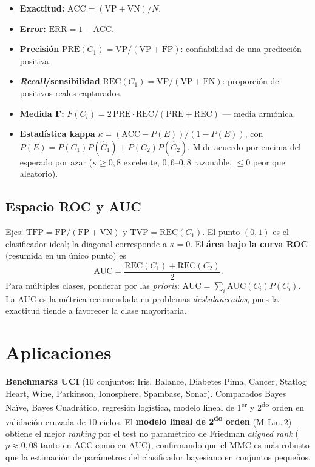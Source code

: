 \begin{itemize}[leftmargin=1.2cm]
  \item \textbf{Exactitud:} $\mathrm{ACC}=(\mathrm{VP}+\mathrm{VN})/N$.
  \item \textbf{Error:} $\mathrm{ERR}=1-\mathrm{ACC}$.
  \item \textbf{Precisión}
        $\mathrm{PRE}(C_1)=\mathrm{VP}/(\mathrm{VP}+\mathrm{FP})$:
        confiabilidad de una predicción positiva.
  \item \textbf{\emph{Recall}/sensibilidad}
        $\mathrm{REC}(C_1)=\mathrm{VP}/(\mathrm{VP}+\mathrm{FN})$:
        proporción de positivos reales capturados.
  \item \textbf{Medida F:}
        $F(C_i)=2\,\mathrm{PRE}\cdot\mathrm{REC}/(\mathrm{PRE}+\mathrm{REC})$
        --- media armónica.
  \item \textbf{Estadística kappa}
        $\kappa=(\mathrm{ACC}-P(E))/(1-P(E))$, con
        $P(E)=P(C_1)P(\hat C_1)+P(C_2)P(\hat C_2)$. Mide acuerdo por
        encima del esperado por azar ($\kappa\geq 0{,}8$ excelente,
        $0{,}6$--$0{,}8$ razonable, $\leq 0$ peor que aleatorio).
\end{itemize}

\subsection{Espacio ROC y AUC}

Ejes: $\mathrm{TFP}=\mathrm{FP}/(\mathrm{FP}+\mathrm{VN})$ y
$\mathrm{TVP}=\mathrm{REC}(C_1)$. El punto $(0,1)$ es el clasificador
ideal; la diagonal corresponde a $\kappa=0$. El \textbf{área bajo la
curva ROC} (resumida en un único punto) es
\[
\mathrm{AUC}=\frac{\mathrm{REC}(C_1)+\mathrm{REC}(C_2)}{2}.
\]
Para múltiples clases, ponderar por las \emph{prioris}:
$\mathrm{AUC}=\sum_i \mathrm{AUC}(C_i)P(C_i)$. La AUC es la métrica
recomendada en problemas \emph{desbalanceados}, pues la exactitud
tiende a favorecer la clase mayoritaria.

\section{Aplicaciones}

\begin{aplicacao}
\textbf{Benchmarks UCI} (10 conjuntos: Iris, Balance, Diabetes Pima,
Cancer, Statlog Heart, Wine, Parkinson, Ionosphere, Spambase, Sonar).
Comparados Bayes Naïve, Bayes Cuadrático, regresión logística,
modelo lineal de 1\textsuperscript{er} y 2\textsuperscript{do} orden
en validación cruzada de 10 ciclos. El \textbf{modelo lineal de
2\textsuperscript{do} orden} (M.\,Lin.\,2) obtiene el mejor
\emph{ranking} por el test no paramétrico de Friedman \emph{aligned
rank} ($p\approx 0{,}08$ tanto en ACC como en AUC), confirmando que el
MMC es más robusto que la estimación de parámetros del clasificador
bayesiano en conjuntos pequeños.
\end{aplicacao}

